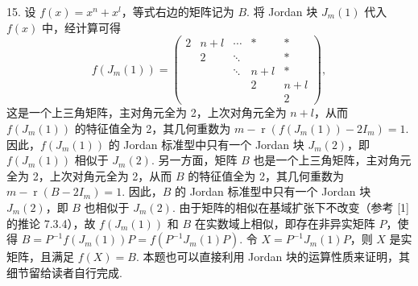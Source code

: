 \documentclass[UTF8, 12pt, fontset=fandol, oneside]{ctexart}
\begin{document}
15. 设 $f(x)=x^n+x^l$，等式右边的矩阵记为 $B$. 将 Jordan 块 $J_m(1)$ 代入 $f(x)$ 中，经计算可得
\[
f(J_m(1))=\left(\begin{array}{ccccc}
2&n+l&\cdots&*&*\\
&2&\ddots&&*\\
&&\ddots&n+l&*\\
&&&2&n+l\\
&&&&2
\end{array}\right),
\]
这是一个上三角矩阵，主对角元全为 2，上次对角元全为 $n+l$，从而 $f(J_m(1))$ 的特征值全为 2，其几何重数为 $m-\operatorname{r}(f(J_m(1))-2I_m)=1$. 因此，$f(J_m(1))$ 的 Jordan 标准型中只有一个 Jordan 块 $J_m(2)$，即 $f(J_m(1))$ 相似于 $J_m(2)$. 另一方面，矩阵 $B$ 也是一个上三角矩阵，主对角元全为 2，上次对角元全为 2，从而 $B$ 的特征值全为 2，其几何重数为 $m-\operatorname{r}(B-2I_m)=1$. 因此，$B$ 的 Jordan 标准型中只有一个 Jordan 块 $J_m(2)$，即 $B$ 也相似于 $J_m(2)$. 由于矩阵的相似在基域扩张下不改变（参考 [1] 的推论 7.3.4），故 $f(J_m(1))$ 和 $B$ 在实数域上相似，即存在非异实矩阵 $P$，使得 $B=P^{-1}f(J_m(1))P=f(P^{-1}J_m(1)P)$. 令 $X=P^{-1}J_m(1)P$，则 $X$ 是实矩阵，且满足 $f(X)=B$. 本题也可以直接利用 Jordan 块的运算性质来证明，其细节留给读者自行完成.
\end{document}
